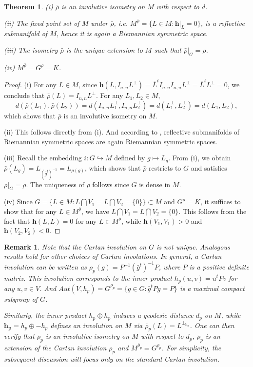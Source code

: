 \documentclass{article}
\newtheorem{thm}{Theorem}[section]
\newtheorem{rmk}{Remark}[section]
\begin{document}
\begin{thm}
(i) $\bar{\rho}$ is an involutive isometry on $M$ with respect to $d$.

(ii) The fixed point set of $M$ under $\bar{\rho}$, i.e. $M^{\bar{\rho}}=\{L \in M: \mathbf{h}|_L=0\}$, is a reflective submanifold of $M$, hence it is again a Riemannian symmetric space.

(iii) The isometry $\bar{\rho}$ is the unique extension to $M$ such that  $\bar{\rho}|_G=\rho$.

(iv) $M^{\bar{\rho}}=G^{\rho}=K$.
\end{thm}
\begin{proof}
(i) For any $L \in M$, since
$\mathbf{h}(L, I_{n,n}L^{\perp})=\bar{L}^tI_{n,n}I_{n,n}L^{\perp}=\bar{L}^tL^{\perp}=0$, we conclude that $\bar{\rho}(L)=I_{n,n}L^{\perp}$. For
any $L_1, L_2 \in M$,
\[
d(\bar{\rho}(L_1), \bar{\rho}(L_2))=d(I_{n,n}L_1^{\perp},I_{n,n}L_2^{\perp})=d(L_1^{\perp},L_2^{\perp})=d(L_1,L_2),
\]
which shows that  $\bar{\rho}$ is an involutive isometry on $M$.

(ii) This follows directly from (i). And according to \cite{L2}, reflective submanifolds of Riemannian symmetric spaces are again Riemannian symmetric spaces.


(iii) Recall the embedding $i: G\hookrightarrow M$  defined by $g \mapsto L_g$. From (i), we obtain $\bar{\rho}(L_g)=L_{(\bar{g}^t)^{-1}}=L_{\rho(g)}$, which shows that $\bar{\rho}$  restricts to $G$ and satisfies
$\bar{\rho}|_G=\rho$.
The uniqueness of $\bar{\rho}$ follows  since  $G$ is dense in $M$.

(iv) Since $G=\{L \in M: L \bigcap V_1=L \bigcap V_2=\{0\}\} \subset M$ and $G^{\rho}=K$, it suffices to show that for any $L \in M^{\bar{\rho}}$, we have $L \bigcap V_1=L \bigcap V_2=\{0\}$.
This follows from the fact that $\mathbf{h}(L,L)=0$ for any $L \in M^{\bar{\rho}}$, while $\mathbf{h}(V_1,V_1)>0$ and $\mathbf{h}(V_2,V_2)<0$.
\end{proof}

\begin{rmk}
Note that the Cartan involution on $G$ is not unique. Analogous results hold for other choices of Cartan involutions. In general, a Cartan involution can be written as
$\rho_p(g)=P^{-1}(\bar{g}^t)^{-1}P$, where $P$ is a positive definite matrix. This involution corresponds to the inner product  $h_p(u,v)=\bar{u}^tPv$ for any $u,v \in V$. And
$Aut(V,h_p)=G^{\rho_p}=\{g \in G: \bar{g}^tPg=P\}$ is a maximal compact subgroup of $G$.

Similarly,  the inner product $h_p \oplus h_p$ induces a geodesic distance $d_{p}$ on $M$, while $\mathbf{h_p}=h_p \oplus -h_p$ defines an involution on $M$ via $\bar{\rho}_p(L)=L^{\perp_{\mathbf{h_p} }}$.
One can then verify that $\bar{\rho}_p$ is an involutive isometry on $M$ with respect to $d_p$, $\bar{\rho}_p$ is an extension of the Cartan involution $\rho_p$ and $M^{\bar{\rho}_p}=G^{\rho_p}$.
For simplicity, the subsequent discussion will focus only on the standard Cartan involution.
\end{rmk}
\end{document}

